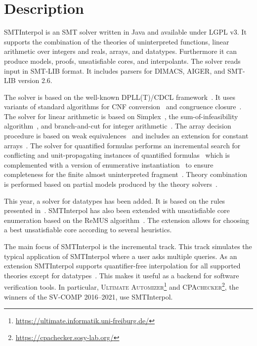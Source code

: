\documentclass[a4paper]{easychair}
\title{\SI and \SIrem\\{\large Versions\version}}
\author{Leonard Fichtner \and Jochen Hoenicke \and Moritz Mohr \and Tanja Schindler}
\institute{
  University of Freiburg\\
  \email{\{hoenicke,schindle\}@informatik.uni-freiburg.de}\\[1ex]
  \today
}
\newcommand\SI{SMTInterpol\xspace}
\begin{document}
\maketitle
\section*{Description}
\SI is an SMT solver written in Java and available under LGPL v3.
It supports the combination of the theories of uninterpreted functions, linear arithmetic over integers and reals, arrays, and datatypes.
Furthermore it can produce models, proofs, unsatisfiable cores, and interpolants.
The solver reads input in SMT-LIB format.
It includes parsers for DIMACS, AIGER, and SMT-LIB version 2.6.

The solver is based on the well-known DPLL(T)/CDCL framework~\cite{DBLP:conf/cav/GanzingerHNOT04}.
It uses variants of standard algorithms for CNF conversion~\cite{DBLP:journals/jsc/PlaistedG86} and congruence closure~\cite{DBLP:conf/rta/NieuwenhuisO05}.
The solver for linear arithmetic is based on Simplex~\cite{DBLP:conf/cav/DutertreM06}, the sum-of-infeasibility algorithm~\cite{DBLP:conf/fmcad/KingBD13}, and branch-and-cut for integer arithmetic~\cite{DBLP:conf/cav/ChristH15,DBLP:conf/cav/DilligDA09}.
The array decision procedure is based on weak equivalences~\cite{DBLP:conf/frocos/ChristH15} and includes an extension for constant arrays~\cite{DBLP:conf/vmcai/HoenickeS19}.
The solver for quantified formulas performs an incremental search for conflicting and unit-propagating instances of quantified formulas~\cite{DBLP:conf/vmcai/HoenickeS21} which is complemented with a version of enumerative instantiation~\cite{DBLP:conf/tacas/ReynoldsBF18} to ensure completeness for the finite almost uninterpreted fragment~\cite{DBLP:conf/cav/GeM09}.
Theory combination is performed based on partial models produced by the theory solvers~\cite{DBLP:journals/entcs/MouraB08}.

This year, a solver for datatypes has been added.
It is based on the rules presented in~\cite{DBLP:journals/jsat/BarrettST07}.
SMTInterpol has also been extended with unsatisfiable core enumeration based on the ReMUS algorithm~\cite{DBLP:conf/atva/BendikCB18}.
The extension allows for choosing a best unsatisfiable core according to several heuristics.

The main focus of \SI is the incremental track.
This track simulates the typical application of \SI where a user asks multiple queries.
As an extension \SI supports quantifier-free interpolation for all supported theories except for datatypes~\cite{DBLP:journals/jar/ChristH16,DBLP:conf/cade/HoenickeS18,DBLP:conf/vmcai/HoenickeS19}.
This makes it useful as a backend for software verification tools. 
In particular, \textsc{Ultimate Automizer}\footnote{\url{https://ultimate.informatik.uni-freiburg.de/}} and \textsc{CPAchecker}\footnote{\url{https://cpachecker.sosy-lab.org/}}, the winners of the SV-COMP 2016--2021, use \SI.
\end{document}
